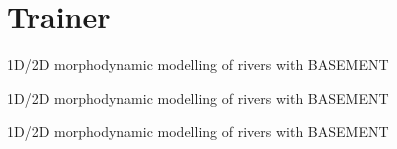 
\section{Trainer}

 1D/2D morphodynamic modelling of rivers with BASEMENT
\sectionsep

 1D/2D morphodynamic modelling of rivers with BASEMENT
\sectionsep

 1D/2D morphodynamic modelling of rivers with BASEMENT
\sectionsep
